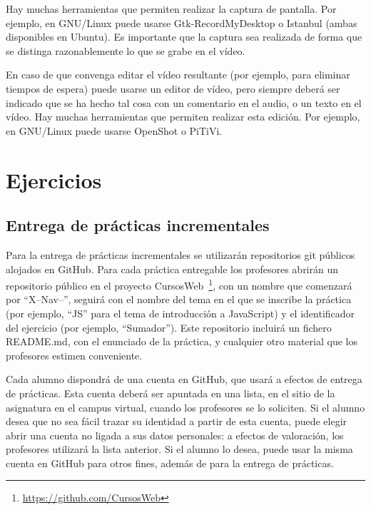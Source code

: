 Hay muchas herramientas que permiten realizar la captura de pantalla. Por ejemplo, en GNU/Linux puede usarse Gtk-RecordMyDesktop o Istanbul (ambas disponibles en Ubuntu). Es importante que la captura sea realizada de forma que se distinga razonablemente lo que se grabe en el vídeo.

En caso de que convenga editar el vídeo resultante (por ejemplo, para eliminar tiempos de espera) puede usarse un editor de vídeo, pero siempre deberá ser indicado que se ha hecho tal cosa con un comentario en el audio, o un texto en el vídeo. Hay muchas herramientas que permiten realizar esta edición. Por ejemplo, en GNU/Linux puede usarse OpenShot o PiTiVi.


\chapter{Ejercicios}

\section{Entrega de prácticas incrementales}
\label{sec:eje-entrega-practicas-incr}

Para la entrega de prácticas incrementales se utilizarán repositorios git públicos alojados en GitHub. Para cada práctica entregable los profesores abrirán un repositorio público en el proyecto CursosWeb~\footnote{\url{https://github.com/CursosWeb}}, con un nombre que comenzará por ``X--Nav--'', seguirá con el nombre del tema en el que se inscribe la práctica (por ejemplo, ``JS'' para el tema de introducción a JavaScript) y el identificador del ejercicio (por ejemplo, ``Sumador''). Este repositorio incluirá un fichero README.md, con el enunciado de la práctica, y cualquier otro material que los profesores estimen conveniente.

Cada alumno dispondrá de una cuenta en GitHub, que usará a efectos de entrega de prácticas. Esta cuenta deberá ser apuntada en una lista, en el sitio de la asignatura en el campus virtual, cuando los profesores se lo soliciten. Si el alumno desea que no sea fácil trazar su identidad a partir de esta cuenta, puede elegir abrir una cuenta no ligada a sus datos personales: a efectos de valoración, los profesores utilizará la lista anterior. Si el alumno lo desea, puede usar la misma cuenta en GitHub para otros fines, además de para la entrega de prácticas.

